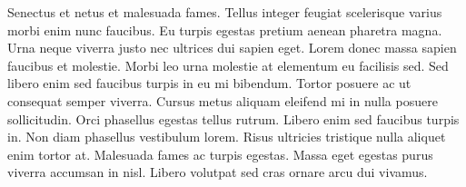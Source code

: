 ﻿\documentclass[11pt,a4paper,twocolumn]{article}         	%
\begin{document}
Senectus et netus et malesuada fames. Tellus integer feugiat scelerisque varius morbi enim nunc faucibus. Eu turpis egestas pretium aenean pharetra magna. Urna neque viverra justo nec ultrices dui sapien eget. Lorem donec massa sapien faucibus et molestie. Morbi leo urna molestie at elementum eu facilisis sed. Sed libero enim sed faucibus turpis in eu mi bibendum. Tortor posuere ac ut consequat semper viverra. Cursus metus aliquam eleifend mi in nulla posuere sollicitudin. Orci phasellus egestas tellus rutrum. Libero enim sed faucibus turpis in. Non diam phasellus vestibulum lorem. Risus ultricies tristique nulla aliquet enim tortor at. Malesuada fames ac turpis egestas. Massa eget egestas purus viverra accumsan in nisl. Libero volutpat sed cras ornare arcu dui vivamus.
\end{document}
